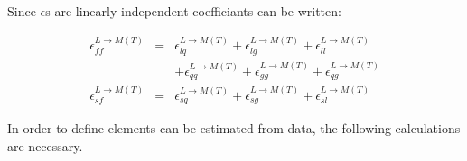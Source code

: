 \documentclass[12pt,oneandhalf,chaparabic,phys,ms,eng]{metu}
\begin{document}
Since $\epsilon$s are linearly independent coefficiants can be written:

\begin{eqnarray}
\epsilon_{ff}^{L \rightarrow M(T)} & = & \epsilon_{lq}^{L \rightarrow M(T)} + \epsilon_{lg}^{L \rightarrow M(T)} + \epsilon_{ll}^{L \rightarrow M(T)} \nonumber \\
& & + \epsilon_{qq}^{L \rightarrow M(T)} + \epsilon_{gg}^{L \rightarrow M(T)} + \epsilon_{qg}^{L \rightarrow M(T)} \label{eq:eps9_} \\ 
\epsilon_{sf}^{L \rightarrow M(T)} & = & \epsilon_{sq}^{L \rightarrow M(T)} + \epsilon_{sg}^{L \rightarrow M(T)} + \epsilon_{sl}^{L \rightarrow M(T)} \label{eq:eps10_}
\end{eqnarray}

In order to define elements can be estimated from data, the following calculations are necessary. 
\end{document}
